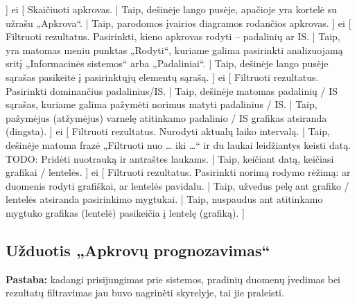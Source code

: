 {    ]
  ei [
    Skaičiuoti apkrovas. |
    Taip, dešinėje lango pusėje, apačioje yra kortelė su užrašu
    „Apkrova“. |
    Taip, parodomos įvairios diagramos rodančios apkrovas.
    ]
  ei [
    Filtruoti rezultatus. Pasirinkti, kieno apkrovas rodyti –
    padalinių ar IS. |
    Taip, yra matomas meniu punktas „Rodyti“, kuriame galima pasirinkti
    analizuojamą sritį „Informacinės sistemos“ arba „Padaliniai“. |
    Taip, dešinėje lango pusėje sąrašas pasikeitė į pasirinktųjų elementų
    sąrašą.
    ]
  ei [
    Filtruoti rezultatus. Pasirinkti dominančius padalinius/IS. |
    Taip, dešinėje matomas padalinių / IS sąrašas, kuriame galima pažymėti
    norimus matyti padalinius / IS. |
    Taip, pažymėjus (atžymėjus) varnelę atitinkamo padalinio / IS 
    grafikas atsiranda (dingsta).
    ]
  ei [
    Filtruoti rezultatus. Nurodyti aktualų laiko intervalą. |
    Taip, dešinėje matoma frazė „Filtruoti nuo … iki …“ ir du laukai
    leidžiantys keisti datą.
    TODO: Pridėti nuotrauką ir antraštes laukams. |
    Taip, keičiant datą, keičiasi grafikai / lentelės.
    ]
  ei [
    Filtruoti rezultatus. Pasirinkti norimą rodymo rėžimą: ar
    duomenis rodyti grafiškai, ar lentelės pavidalu. |
    Taip, užvedus pelę ant grafiko / lentelės atsiranda pasirinkimo
    mygtukai. |
    Taip, nuspaudus ant atitinkamo mygtuko grafikas (lentelė) pasikeičia
    į lentelę (grafiką).
    ]
}

\subsection{Užduotis „Apkrovų prognozavimas“}

\label{sec:cw_apkrovu_prognozavimas}

\textbf{Pastaba:} kadangi prisijungimas prie sistemos, pradinių
duomenų įvedimas bei rezultatų filtravimas jau buvo nagrinėti
 skyrelyje, tai jie praleisti.


